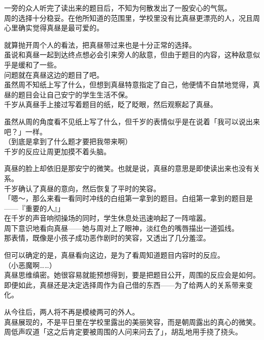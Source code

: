 一旁的众人听完了读出来的题目后，不知为何散发出了一股安心的气氛。\\

周的选择十分稳妥。在他所知道的范围里，学校里没有比真昼更漂亮的人，况且周心里确实觉得真昼是最可爱的。

就算抛开周个人的看法，把真昼带过来也是十分正常的选择。\\

虽说和真昼一起到达终点想必会引来旁人的敌意，但由于题目的内容，这种敌意似乎是缓和了一些。\\

问题就在真昼这边的题目了吧。\\

虽然周不知纸上写了什么，但想到真昼特意指定了自己，他便情不自禁地觉得，真昼的题目会让自己安宁的学生生活不保。\\

千岁从真昼手上接过写着题目的纸，眨了眨眼，然后观察起了真昼。

虽然从周的角度看不见纸上写了什么，但千岁的表情似乎是在说着「我可以说出来吧？」一样。\\

（到底是拿到了什么题才要把我带来啊）\\

千岁的反应让周更加摸不着头脑。

真昼的脸上却依旧是那安宁的微笑。也就是说，真昼的意思是即使读出来也没有关系。\\

千岁确认了真昼的意向，然后恢复了平时的笑容。\\

「嗯～，那么来看一看同时冲线的白组第一拿到的题目。白组第一拿到的题目是——『重要的人』」\\

在千岁的声音响彻操场的同时，学生休息处迅速响起了一阵喧嚣。\\

周下意识地看向真昼——她与周对上了眼神，淡红色的嘴唇描出一道弧线。\\

那表情，既像是小孩子成功恶作剧时的笑容，又透出了几分羞涩。

但可以确定的是，真昼看向这边，是为了看周知道题目内容时的反应。\\

（小恶魔啊……）\\

真昼思维缜密。她很容易就能预想得到，要是把题目公开，周围的反应会是如何。\\

即便如此，真昼还是决定选择周作为自己借的东西——为了给两人的关系带来变化。

从今往后，两人将不再是模棱两可的外人。\\

真昼展现的，不是平日里在学校里露出的美丽笑容，而是朝周露出的真心的微笑。周低声叹道「这之后肯定要被周围的人问来问去了」，胡乱地用手挠了挠头。
